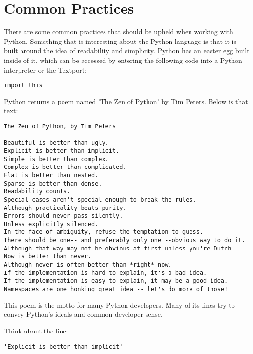 
\section{Common Practices}

\begin{fullwidth}

There are some common practices that should be upheld when working with Python. Something that is interesting about the Python language is that it is built around the idea of readability and simplicity. Python has an easter egg built inside of it, which can be accessed by entering the following code into a Python interpreter or the Textport:

\begin{lstlisting}
import this
\end{lstlisting}

Python returns a poem named 'The Zen of Python' by Tim Peters. Below is that text:

\begin{lstlisting}
The Zen of Python, by Tim Peters

Beautiful is better than ugly.
Explicit is better than implicit.
Simple is better than complex.
Complex is better than complicated.
Flat is better than nested.
Sparse is better than dense.
Readability counts.
Special cases aren't special enough to break the rules.
Although practicality beats purity.
Errors should never pass silently.
Unless explicitly silenced.
In the face of ambiguity, refuse the temptation to guess.
There should be one-- and preferably only one --obvious way to do it.
Although that way may not be obvious at first unless you're Dutch.
Now is better than never.
Although never is often better than *right* now.
If the implementation is hard to explain, it's a bad idea.
If the implementation is easy to explain, it may be a good idea.
Namespaces are one honking great idea -- let's do more of those!

\end{lstlisting}

This poem is the motto for many Python developers. Many of its lines try to convey Python's ideals and common developer sense.

Think about the line:

\begin{lstlisting}
'Explicit is better than implicit'
\end{lstlisting}


\end{fullwidth}
